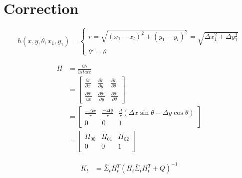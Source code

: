 \documentclass[oneside, 12pt, a4paper]{book}
\begin{document}
\section{Correction}

\begin{equation}
    h(x,y,\theta, x_1, y_1) = 
    \begin{cases}
        r = \sqrt{(x_1 - x_l)^2 + (y_1-y_l)^2} = \sqrt{\Delta x_1^2 + \Delta y_1^2}\\
        \theta' = \theta
      \end{cases}
\end{equation}

\begin{equation}
    \begin{split}
        H &= \frac{\partial h}{\partial state}\\
        &= 
        \begin{bmatrix}
            \frac{\partial r}{\partial x} & \frac{\partial r}{\partial y} & \frac{\partial r}{\partial \theta}\\
            \frac{\partial \theta'}{\partial x} & \frac{\partial \theta'}{\partial y} & \frac{\partial \theta'}{\partial \theta}
        \end{bmatrix}\\
        &=
        \begin{bmatrix}
            \frac{-\Delta x}{r} & \frac{-\Delta y}{r} & \frac{d}{r} (\Delta x\sin\theta - \Delta y\cos\theta) \\
            0 & 0 & 1
        \end{bmatrix}\\
        &=
        \begin{bmatrix}
            H_{00} & H_{01} & H_{02} \\
            0 & 0 & 1
        \end{bmatrix}
    \end{split}
\end{equation}

\begin{equation}
    \begin{split}
        K_t &= \bar{\Sigma}_t H_t^T(H_t \bar{\Sigma}_t H_t^T + Q)^{-1} \\ 
    \end{split}
\end{equation}
\end{document}
